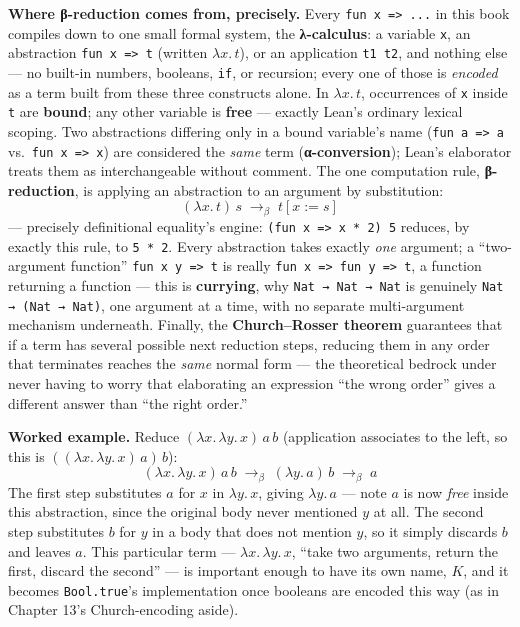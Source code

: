 \textbf{Where β-reduction comes from, precisely.} Every \texttt{fun x => ...} in this book compiles down to one small formal system, the \textbf{λ-calculus}: a variable \texttt{x}, an abstraction \texttt{fun x => t} (written \(\lambda x.\, t\)), or an application \texttt{t1 t2}, and nothing else --- no built-in numbers, booleans, \texttt{if}, or recursion; every one of those is \emph{encoded} as a term built from these three constructs alone. In \(\lambda x.\, t\), occurrences of \texttt{x} inside \texttt{t} are \textbf{bound}; any other variable is \textbf{free} --- exactly Lean's ordinary lexical scoping. Two abstractions differing only in a bound variable's name (\texttt{fun a => a} vs.~\texttt{fun x => x}) are considered the \emph{same} term (\textbf{α-conversion}); Lean's elaborator treats them as interchangeable without comment. The one computation rule, \textbf{β-reduction}, is applying an abstraction to an argument by substitution: \[
(\lambda x.\, t)\, s \;\longrightarrow_\beta\; t[x := s]
\] --- precisely definitional equality's engine: \texttt{(fun x => x * 2) 5} reduces, by exactly this rule, to \texttt{5 * 2}. Every abstraction takes exactly \emph{one} argument; a ``two-argument function'' \texttt{fun x y => t} is really \texttt{fun x => fun y => t}, a function returning a function --- this is \textbf{currying}, why \texttt{Nat → Nat → Nat} is genuinely \texttt{Nat → (Nat → Nat)}, one argument at a time, with no separate multi-argument mechanism underneath. Finally, the \textbf{Church--Rosser theorem} guarantees that if a term has several possible next reduction steps, reducing them in any order that terminates reaches the \emph{same} normal form --- the theoretical bedrock under never having to worry that elaborating an expression ``the wrong order'' gives a different answer than ``the right order.''

\textbf{Worked example.} Reduce \((\lambda x.\, \lambda y.\, x)\, a\, b\) (application associates to the left, so this is \(((\lambda x.\, \lambda y.\, x)\, a)\, b\)): \[
(\lambda x.\, \lambda y.\, x)\, a\, b
\;\longrightarrow_\beta\; (\lambda y.\, a)\, b
\;\longrightarrow_\beta\; a
\] The first step substitutes \(a\) for \(x\) in \(\lambda y.\, x\), giving \(\lambda y.\, a\) --- note \(a\) is now \emph{free} inside this abstraction, since the original body never mentioned \(y\) at all. The second step substitutes \(b\) for \(y\) in a body that does not mention \(y\), so it simply discards \(b\) and leaves \(a\). This particular term --- \(\lambda x.\, \lambda y.\, x\), ``take two arguments, return the first, discard the second'' --- is important enough to have its own name, \(K\), and it becomes \texttt{Bool.true}'s implementation once booleans are encoded this way (as in Chapter 13's Church-encoding aside).

